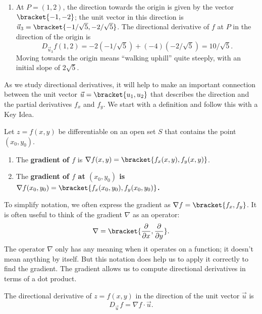 {\begin{enumerate}
	Finding these directions of ``no elevation change'' is important.
	
	\item		At $P=(1,2)$, the direction towards the origin is given by the vector $\bracket{-1,-2}$; the unit vector in this direction is $\vec u_3=\bracket{-1/\sqrt{5},-2/\sqrt{5}}$. The directional derivative of $f$ at $P$ in the direction of the origin is
	$$D_{\vec u_3}f(1,2) = -2(-1/\sqrt{5}) + (-4)(-2/\sqrt{5}) = 10/\sqrt{5}%
	.$$
	Moving towards the origin means ``walking uphill'' quite steeply, with an initial slope of $2\sqrt5$.\eoehere
\end{enumerate}}

As we study directional derivatives, it will help to make an important connection between the unit vector $\vec u =\bracket{u_1,u_2}$ that describes the direction and the partial derivatives $f_x$ and $f_y$. We start with a definition and follow this with a Key Idea.

{Let $z=f(x,y)$ be differentiable on an open set $S$ that contains the point $(x_0,y_0)$.
\begin{enumerate}
	\item The \textbf{gradient of $f$} is $\nabla f(x,y) =\bracket{f_x(x,y),f_y(x,y)}$.
	\item The \textbf{gradient of $f$ at $(x_0,y_0)$ is $\nabla f(x_0,y_0) =\bracket{f_x(x_0,y_0),f_y(x_0,y_0)}$.}
\end{enumerate}
}


To simplify notation, we often express the gradient as $\nabla f =\bracket{f_x, f_y}$. It is often useful to think of the gradient $\nabla$ as an operator:
\[\nabla=\bracket{\frac\partial{\partial x},\frac\partial{\partial y}}.\]
The operator $\nabla$ only has any meaning when it operates on a function; it doesn't mean anything by itself.  But this notation does help us to apply it correctly to find the gradient. The gradient allows us to compute directional derivatives in terms of a dot product.

{%
The directional derivative of $z=f(x,y)$ in the direction of the unit vector $\vec u$ is
\[D_{\vec u\,}f = \nabla f\cdot \vec u.\]}

